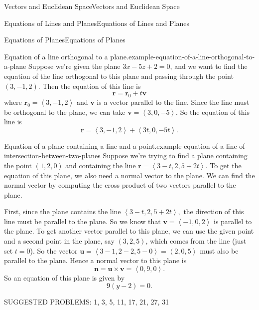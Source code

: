 \documentclass[10pt,]{book}
\numberwithin{equation}{section}
\newcommand{\vv}[1]{\mathbf{#1}}
\newcommand{\dotprod}[1]{\left\langle #1 \right\rangle}
\begin{document}
\begin{chapterptx}{Vectors and Euclidean Space}{}{Vectors and Euclidean Space}{}{}
\begin{sectionptx}{Equations of Lines and Planes}{}{Equations of Lines and Planes}{}{}
\begin{subsectionptx}{Equations of Planes}{}{Equations of Planes}{}{}
\begin{example}{Equation of a line orthogonal to a plane.}{example-equation-of-a-line-orthogonal-to-a-plane}
\hypertarget{p-1011}{}%
Suppose we're given the plane \(3x-5z+2 = 0\), and we want to find the equation of the line orthogonal to this plane and passing through the point \((3,-1,2)\). Then the equation of this line is%
%
\begin{equation*}
\vv{r} = \vv{r}_{0}+t\vv{v}
\end{equation*}
\hypertarget{p-1012}{}%
where \(\vv{r}_{0} = \dotprod{3,-1,2}\) and \(\vv{v}\) is a vector parallel to the line. Since the line must be orthogonal to the plane, we can take \(\vv{v} = \dotprod{3,0,-5}\). So the equation of this line is%
%
\begin{equation*}
\vv{r} = \dotprod{3,-1,2}+\dotprod{3t,0,-5t}.
\end{equation*}
\end{example}
\begin{example}{Equation of a plane containing a line and a point.}{example-equation-of-a-line-of-intersection-between-two-planes}%
\hypertarget{p-1013}{}%
Suppose we're trying to find a plane containing the point \((1,2,0)\) and containing the line \(\vv{r} = \dotprod{3-t,2,5+2t}\). To get the equation of this plane, we also need a normal vector to the plane. We can find the normal vector by computing the cross product of two vectors parallel to the plane.%
\par
\hypertarget{p-1014}{}%
First, since the plane contains the line \(\dotprod{3-t,2,5+2t},\) the direction of this line must be parallel to the plane. So we know that \(\vv{v} = \dotprod{-1,0,2}\) is parallel to the plane. To get another vector parallel to this plane, we can use the given point and a second point in the plane, say \((3,2,5)\), which comes from the line (just set \(t=0\)). So the vector \(\vv{u} = \dotprod{3-1,2-2,5-0} = \dotprod{2,0,5}\) must also be parallel to the plane. Hence a normal vector to this plane is%
%
\begin{equation*}
\vv{n} = \vv{u}\times\vv{v} = \dotprod{0,9,0}.
\end{equation*}
\hypertarget{p-1015}{}%
So an equation of this plane is given by%
%
\begin{equation*}
9(y-2) = 0.
\end{equation*}
\end{example}
\hypertarget{p-1016}{}%
SUGGESTED PROBLEMS: 1, 3, 5, 11, 17, 21, 27, 31%
\end{subsectionptx}
\end{sectionptx}
%
%
\typeout{************************************************}

\end{chapterptx}
\end{document}
